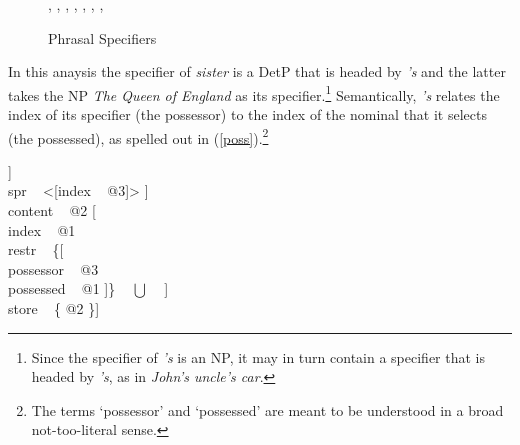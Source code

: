 \documentclass[output=paper]{langsci/langscibook}
\begin{document}
\begin{figure}  
\begin{center}
\footnotesize
\tree
  {,
    {,
      {,
        {}},
      {,
        {}}},
    {,
      {}}}
\caption{\label{cousin} Phrasal Specifiers } 
\normalsize
\end{center}
\end{figure}

In this anaysis the specifier of \emph{sister} is a DetP that is headed by \emph{'s} 
and the latter takes the NP \emph{The Queen of England} as its specifier.\footnote{Since the 
specifier of \emph{'s} is an NP, it may in turn contain a specifier that is headed 
by \emph{'s}, as in \emph{John's uncle's car}.}
Semantically, \emph{'s} relates the index of its specifier (the possessor) to the index
of the nominal that it selects (the possessed), as spelled out in (\ref{poss}).\footnote{The
terms `possessor' and `possessed' are meant to be understood in a broad not-too-literal sense.}     

\begin{exe} 
\ex\label{poss}
\begin{avm}
[cat [head [\type{det}                       \\
            spec [\type{parameter}           \\
                  index ~ @1                  \\
                  restr ~ \avmbox{$\Sigma$} ]] \\
      spr ~ <[index ~ @3]> ]                  \\
 content ~ @2 [                \\
               index ~ @1                     \\
               restr ~ \{[    \\
                          possessor ~ @3      \\
                          possessed ~ @1 ]\} ~ $\bigcup$ ~ \avmbox{$\Sigma$} ] \\
 store ~ \{ @2 \}]  
\end{avm}
\end{exe}
\end{document}
